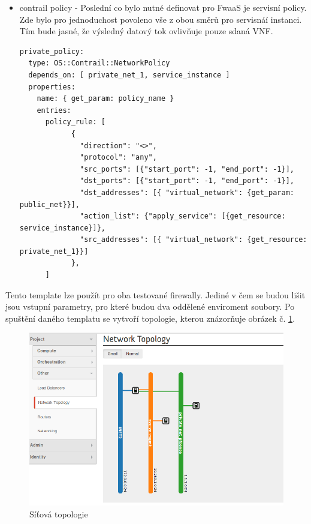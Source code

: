 \begin{itemize}
\item contrail policy - Poslední co bylo nutné definovat pro FwaaS je servisní policy. Zde bylo pro jednoduchost povoleno vše z obou směrů pro servisnáí instanci. Tím bude jasné, že výsledný datový tok ovlivňuje pouze sdaná VNF.

\begin{lstlisting}[caption=Contrail network policy]
private_policy:
  type: OS::Contrail::NetworkPolicy
  depends_on: [ private_net_1, service_instance ]
  properties:
    name: { get_param: policy_name }
    entries:
      policy_rule: [
            { 
              "direction": "<>", 
              "protocol": "any", 
              "src_ports": [{"start_port": -1, "end_port": -1}],
              "dst_ports": [{"start_port": -1, "end_port": -1}],
              "dst_addresses": [{ "virtual_network": {get_param: public_net}}], 
              "action_list": {"apply_service": [{get_resource: service_instance}]}, 
              "src_addresses": [{ "virtual_network": {get_resource: private_net_1}}] 
            }, 
      ]
\end{lstlisting}
\end{itemize}

Tento template lze použít pro oba testované firewally. Jediné v čem se budou lišit jsou vstupní parametry, pro které budou dva oddělené enviroment soubory. Po spuštění daného templatu se vytvoří topologie, kterou znázorňuje obrázek č. \ref{fig:fwaas_topologie}. 

\begin{figure}[h]
\begin{centering}
\includegraphics[scale=0.45]{images/fwaas_topologie}
\par\end{centering}
\caption{Síťová topologie\label{fig:fwaas_topologie}}
\end{figure}

